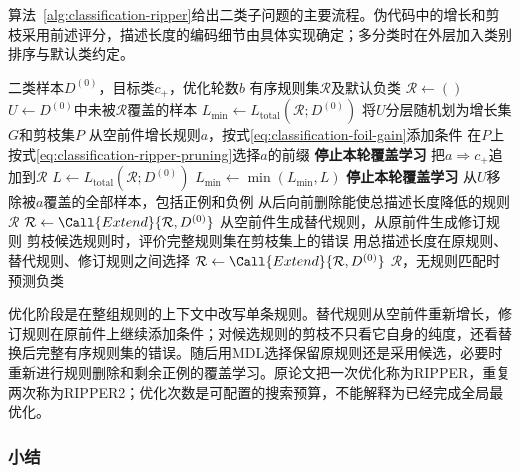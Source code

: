 算法~\ref{alg:classification-ripper}给出二类子问题的主要流程。伪代码中的增长和剪枝采用前述评分，描述长度的编码细节由具体实现确定；多分类时在外层加入类别排序与默认类约定。

\begin{algorithm}[RIPPER的覆盖学习与规则优化]
  \label{alg:classification-ripper}
  \begin{algorithmic}[1]
    \Require 二类样本$D^{(0)}$，目标类$c_+$，优化轮数$b$
    \Ensure 有序规则集$\mathcal{R}$及默认负类
    \State $\mathcal{R}\gets()$
      \State $U\gets D^{(0)}$中未被$\mathcal{R}$覆盖的样本
      \State $L_{\min}\gets L_{\mathrm{total}}(\mathcal{R};D^{(0)})$
        \State 将$U$分层随机划为增长集$G$和剪枝集$P$
        \State 从空前件增长规则$a$，按式\eqref{eq:classification-foil-gain}添加条件
        \State 在$P$上按式\eqref{eq:classification-ripper-pruning}选择$a$的前缀
          \State \textbf{停止本轮覆盖学习}
        \EndIf
        \State 把$a\Longrightarrow c_+$追加到$\mathcal{R}$
        \State $L\gets L_{\mathrm{total}}(\mathcal{R};D^{(0)})$
        \State $L_{\min}\gets\min(L_{\min},L)$
          \State \textbf{停止本轮覆盖学习}
        \EndIf
        \State 从$U$移除被$a$覆盖的全部样本，包括正例和负例
      \EndWhile
      \State 从后向前删除能使总描述长度降低的规则
      \State \Return $\mathcal{R}$
    \EndFunction
    \State $\mathcal{R}\gets\Call{Extend}{\mathcal{R},D^{(0)}}$
        \State 从空前件生成替代规则，从原前件生成修订规则
        \State 剪枝候选规则时，评价完整规则集在剪枝集上的错误
        \State 用总描述长度在原规则、替代规则、修订规则之间选择
      \EndFor
      \State $\mathcal{R}\gets\Call{Extend}{\mathcal{R},D^{(0)}}$
    \EndFor
    \State \Return $\mathcal{R}$，无规则匹配时预测负类
  \end{algorithmic}
\end{algorithm}

优化阶段是在整组规则的上下文中改写单条规则。替代规则从空前件重新增长，修订规则在原前件上继续添加条件；对候选规则的剪枝不只看它自身的纯度，还看替换后完整有序规则集的错误。随后用MDL选择保留原规则还是采用候选，必要时重新进行规则删除和剩余正例的覆盖学习。原论文把一次优化称为RIPPER，重复两次称为RIPPER2；优化次数是可配置的搜索预算，不能解释为已经完成全局最优化。

\subsubsection{小结}
\label{sec:classification-ripper-summary}

